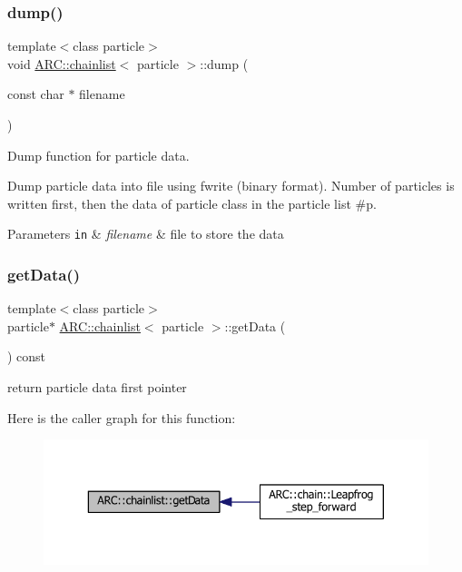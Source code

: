 \subsubsection{\texorpdfstring{dump()}{dump()}}
{\footnotesize\ttfamily template$<$class particle$>$ \\
void \hyperlink{classARC_1_1chainlist}{A\+R\+C\+::chainlist}$<$ particle $>$\+::dump (\begin{DoxyParamCaption}\item[{const char $\ast$}]{filename }\end{DoxyParamCaption})\hspace{0.3cm}{\ttfamily [inline]}}



Dump function for particle data. 

Dump particle data into file using fwrite (binary format). Number of particles is written first, then the data of particle class in the particle list \#p. 
\begin{DoxyParams}[1]{Parameters}
\mbox{\tt in}  & {\em filename} & file to store the data \\
\hline
\end{DoxyParams}
\hypertarget{classARC_1_1chainlist_a04c91168be9a14ed7b9bd958d6b1f369}{}\label{classARC_1_1chainlist_a04c91168be9a14ed7b9bd958d6b1f369} 
\subsubsection{\texorpdfstring{get\+Data()}{getData()}}
{\footnotesize\ttfamily template$<$class particle$>$ \\
particle$\ast$ \hyperlink{classARC_1_1chainlist}{A\+R\+C\+::chainlist}$<$ particle $>$\+::get\+Data (\begin{DoxyParamCaption}{ }\end{DoxyParamCaption}) const\hspace{0.3cm}{\ttfamily [inline]}}



return particle data first pointer 

Here is the caller graph for this function\+:
\nopagebreak
\begin{figure}[H]
\begin{center}
\leavevmode
\includegraphics[width=343pt]{classARC_1_1chainlist_a04c91168be9a14ed7b9bd958d6b1f369_icgraph}
\end{center}
\end{figure}
\hypertarget{classARC_1_1chainlist_a5cf42b57b7088cf7418ae3d9f1b610fa}{}\label{classARC_1_1chainlist_a5cf42b57b7088cf7418ae3d9f1b610fa} 
